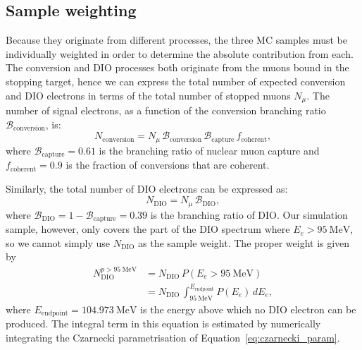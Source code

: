 \subsection{Sample weighting}\label{sec:sample_weighting}

Because they originate from different processes, the three MC samples must be
individually weighted in order to determine the absolute contribution from each.
The conversion and DIO processes both originate from the muons bound in the
stopping target, hence we can express the total number of expected conversion
and DIO electrons in terms of the total number of stopped muons $N_\mu$.
The number of signal electrons, as a function of the conversion branching
ratio $\mathcal{B}_\mathrm{conversion}$, is:
\begin{equation}\label{eq:weight_signal}
N_\mathrm{conversion} = 
N_\mu \, \mathcal{B}_\mathrm{conversion} \, 
\mathcal{B}_\mathrm{capture} \, f_\mathrm{coherent},
\end{equation}
where $\mathcal{B}_\mathrm{capture} = 0.61$ is the branching ratio of nuclear
muon capture and $f_\mathrm{coherent}=0.9$ is the
fraction of conversions that are coherent.

Similarly, the total number of DIO electrons can be expressed as:
\begin{equation}
N_\mathrm{DIO} = N_\mu \, \mathcal{B}_\mathrm{DIO},
\end{equation}
where $\mathcal{B}_\mathrm{DIO} = 1 - \mathcal{B}_\mathrm{capture} = 0.39$ is
the branching ratio of DIO. Our simulation sample, however, only covers the part
of the DIO spectrum where $E_e > \SI{95}{\MeV}$, so we cannot simply use
$N_\mathrm{DIO}$ as the sample weight. The proper weight is given by 
\begin{align}\label{eq:weight_dio}
N_\mathrm{DIO}^{p>\SI{95}{\MeV}} &= N_\mathrm{DIO} \, P(E_e > \SI{95}{\MeV}) \\\nonumber
&= N_\mathrm{DIO}\,\int_{\SI{95}{\MeV}}^{E_\mathrm{endpoint}} P(E_e)\,dE_e,
\end{align}
where $E_\mathrm{endpoint} = \SI{104.973}{\MeV}$ is the energy above which no
DIO electron can be produced. The integral term in this equation is estimated by
numerically integrating the Czarnecki parametrisation of
Equation~\ref{eq:czarnecki_param}.

